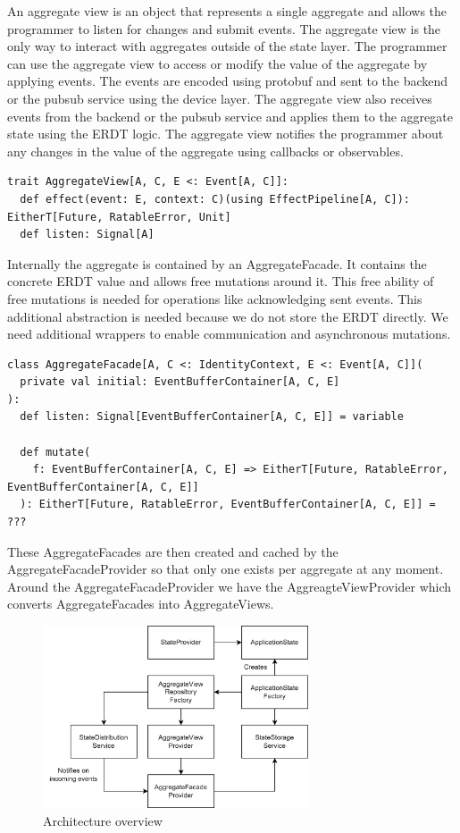 \documentclass[
	ngerman,
	ruledheaders=section,   %
	class=report,		    %
	thesis={type=bachelor}, %
	accentcolor=9c,			%
	custommargins=true,    %
	marginpar=false,        %
	parskip=half-,          %
	fontsize=11pt,          %
]{tudapub}
\begin{document}
An aggregate view is an object that represents a single aggregate and allows the programmer to listen for changes and submit events. The aggregate view is the only way to interact with aggregates outside of the state layer. The programmer can use the aggregate view to access or modify the value of the aggregate by applying events. The events are encoded using protobuf and sent to the backend or the pubsub service using the device layer. The aggregate view also receives events from the backend or the pubsub service and applies them to the aggregate state using the ERDT logic. The aggregate view notifies the programmer about any changes in the value of the aggregate using callbacks or observables.

\begin{lstlisting}
trait AggregateView[A, C, E <: Event[A, C]]:
  def effect(event: E, context: C)(using EffectPipeline[A, C]): EitherT[Future, RatableError, Unit]
  def listen: Signal[A]
\end{lstlisting}

Internally the aggregate is contained by an AggregateFacade. It contains the concrete ERDT value and allows free mutations around it. This free ability of free mutations is needed for operations like acknowledging sent events. This additional abstraction is needed because we do not store the ERDT directly. We need additional wrappers to enable communication and asynchronous mutations. 

\begin{lstlisting}
class AggregateFacade[A, C <: IdentityContext, E <: Event[A, C]](
  private val initial: EventBufferContainer[A, C, E]
):
  def listen: Signal[EventBufferContainer[A, C, E]] = variable

  def mutate(
    f: EventBufferContainer[A, C, E] => EitherT[Future, RatableError, EventBufferContainer[A, C, E]]
  ): EitherT[Future, RatableError, EventBufferContainer[A, C, E]] = ???

\end{lstlisting}

These AggregateFacades are then created and cached by the AggregateFacadeProvider so that only one exists per aggregate at any moment. Around the AggregateFacadeProvider we have the AggreagteViewProvider which converts AggregateFacades into AggregateViews. 

\begin{figure}[h]
  \centering
  \includegraphics[width=0.7\textwidth]{state.png}
  \caption{Architecture overview}
\end{figure}
\end{document}
